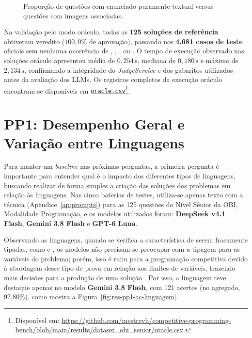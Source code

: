 \begin{figure}[!htbp]
\centering

\caption[Distribuição das questões quanto à presença de imagens]{Proporção de questões com enunciado puramente textual versus questões com imagens associadas.}
\label{fig:res-base-imagens}
\end{figure}
\FloatBarrier

Na validação pelo modo oráculo, todas as \textbf{125 soluções de referência} obtiveram veredito  ($100{,}0\%$ de aprovação), passando nos \textbf{4.681 casos de teste} oficiais sem nenhuma ocorrência de , , ,  ou . O tempo de execução observado nas soluções oráculo apresentou média de $0{,}254\,\mathrm{s}$, mediana de $0{,}180\,\mathrm{s}$ e máximo de $2{,}134\,\mathrm{s}$, confirmando a integridade do \textit{JudgeService} e dos gabaritos utilizados antes da avaliação dos LLMs. Os registros completos da execução oráculo encontram-se disponíveis em \href{https://github.com/mestrevh/competitive-programming-bench/blob/main/results/dataset_obi_senior/oracle.csv}{\texttt{oracle.csv}}\footnote{Disponível em: \url{https://github.com/mestrevh/competitive-programming-bench/blob/main/results/dataset_obi_senior/oracle.csv}.}.


\section{PP1: Desempenho Geral e Variação entre Linguagens}\label{sec:res-rq1}

Para manter um \textit{baseline} nas próximas perguntas, a primeira pergunta é importante para entender qual é o impacto dos diferentes tipos de linguagens, buscando realizar de forma simples a criação das soluções dos problemas em relação às linguagens. Nas cinco baterias de testes, utiliza-se apenas texto com a técnica  (Apêndice~\ref{ap:prompts}) para as 125 questões do Nível Sênior da OBI, Modalidade Programação, e os modelos utilizados foram: \textbf{DeepSeek v4.1 Flash}, \textbf{Gemini 3.8 Flash} e \textbf{GPT-6 Luna}.

Observando as linguagens, quando se verifica a característica de serem fracamente tipadas, como  e , os modelos não precisam se preocupar com a tipagem para as variáveis do problema; porém, isso é ruim para a programação competitiva devido à abordagem desse tipo de prova em relação aos limites de variáveis, trazendo mais decisões para a produção de uma solução . Por isso, a linguagem  teve destaque apenas no modelo \textbf{Gemini 3.8 Flash}, com 121 acertos (no agregado, 92,80\%), como mostra a Figura~\ref{fig:res-pp1-ac-linguagem}.

